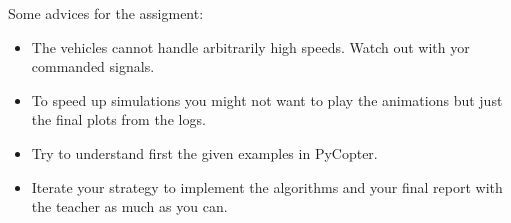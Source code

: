 \documentclass[a4paper, onecolumn]{ieeeconf}
\begin{document}
\begin{appendix}
Some advices for the assigment:
\begin{itemize}
	\item The vehicles cannot handle arbitrarily high speeds. Watch out with yor commanded signals.
	\item To speed up simulations you might not want to play the animations but just the final plots from the logs.
	\item Try to understand first the given examples in PyCopter.
	\item Iterate your strategy to implement the algorithms and your final report with the teacher as much as you can.
\end{itemize}
\end{appendix}




\end{document}
